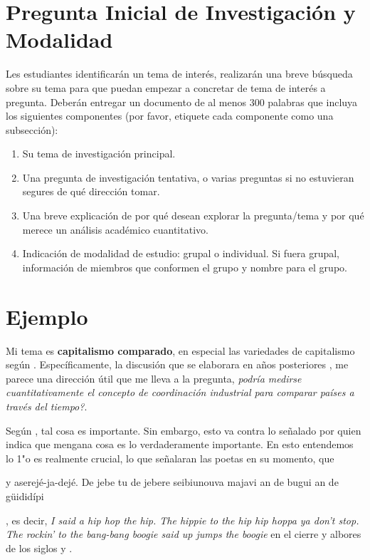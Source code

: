 \documentclass[11pt]{article}
\begin{document}
\section*{Pregunta Inicial de Investigación y Modalidad}
Les estudiantes identificarán un tema de interés, realizarán una breve búsqueda sobre su tema para que puedan empezar a concretar de tema de interés a pregunta. Deberán entregar un documento de al menos 300 palabras que incluya los siguientes componentes (por favor, etiquete cada componente como una subsección):
\begin{enumerate}
    \item Su tema de investigación principal.
    \item Una pregunta de investigación tentativa, o varias preguntas si no estuvieran segures de qué dirección tomar.
    \item Una breve explicación de por qué desean explorar la pregunta/tema y por qué merece un análisis académico cuantitativo.
    \item Indicación de modalidad de estudio: grupal o individual. Si fuera grupal, información de miembros que conformen el grupo y nombre para el grupo.
\end{enumerate}

\section*{Ejemplo}
Mi tema es \textbf{capitalismo comparado}, en especial las variedades de capitalismo seg\'un \citet{hall2001introduction}. Espec\'ificamente, la discusi\'on que se elaborara en a\~nos posteriores \citep{hall2009institutional}, me parece una direcci\'on \'util que me lleva a la pregunta, \textit{podría medirse cuantitativamente el concepto de coordinaci\'on industrial para comparar países a través del tiempo?}.


Según \citet{giovannetti2015}, tal cosa es importante. Sin embargo, esto va contra lo señalado por \citet{lopezroman2012} quien indica que mengana cosa es lo verdaderamente importante. En esto entendemos lo 1"o es realmente crucial, lo que señalaran las poetas en su momento, que \begin{quoting}y aserejé-ja-dejé. De jebe tu de jebere seibiunouva majavi an de bugui an de güididípi\end{quoting}, es decir, \textit{I said a hip hop the hip. The hippie to the hip hip hoppa ya don’t stop. The rockin’ to the bang-bang boogie said up jumps the boogie} en el cierre y albores de los siglos  y .
\end{document}
